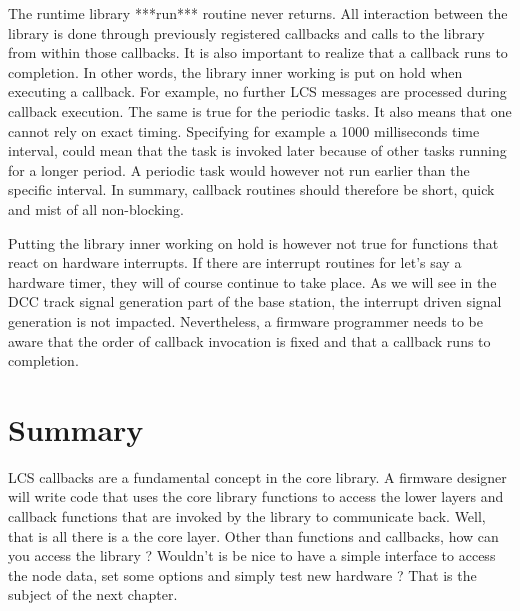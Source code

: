 The runtime library ***run*** routine never returns. All interaction between the library is done through previously registered callbacks and calls to the library from within those callbacks. It is also important to realize that a callback runs to completion. In other words, the library inner working is put on hold when executing a callback. For example, no further LCS messages are processed during callback execution. The same is true for the periodic tasks. It also means that one cannot rely on exact timing. Specifying for example a 1000 milliseconds time interval, could mean that the task is invoked later because of other tasks running for a longer period. A periodic task would however not run earlier than the specific interval. In summary, callback routines should therefore be short, quick and mist of all non-blocking.

Putting the library inner working on hold is however not true for functions that react on hardware interrupts. If there are interrupt routines for let's say a hardware timer, they will of course continue to take place. As we will see in the DCC track signal generation part of the base station, the interrupt driven signal generation is not impacted. Nevertheless, a firmware programmer needs to be aware that the order of callback invocation is fixed and that a callback runs to completion.

\section{Summary}

LCS callbacks are a fundamental concept in the core library. A firmware designer will write code that uses the core library functions to access the lower layers and callback functions that are invoked by the library to communicate back. Well, that is all there is a the core layer. Other than functions and callbacks, how can you access the library ? Wouldn't is be nice to have a simple interface to access the node data, set some options and simply test new hardware ? That is the subject of the next chapter.


